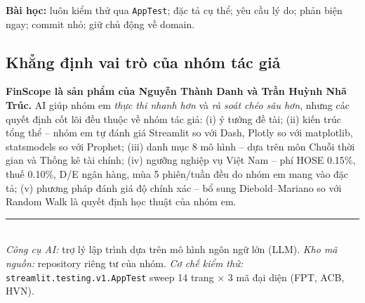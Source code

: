 \documentclass[12pt,a4paper]{article}
\begin{document}
\textbf{Bài học:} luôn kiểm thử qua \texttt{AppTest}; đặc tả cụ thể; yêu cầu lý do; phản biện ngay; commit nhỏ; giữ chủ động về domain.

\subsection{Khẳng định vai trò của nhóm tác giả}

\textbf{FinScope là sản phẩm của Nguyễn Thành Danh và Trần Huỳnh Nhã Trúc.} AI giúp nhóm em \emph{thực thi nhanh hơn} và \emph{rà soát chéo sâu hơn}, nhưng các quyết định cốt lõi đều thuộc về nhóm tác giả: (i) ý tưởng đề tài; (ii) kiến trúc tổng thể -- nhóm em tự đánh giá Streamlit so với Dash, Plotly so với matplotlib, statsmodels so với Prophet; (iii) danh mục 8 mô hình -- dựa trên môn Chuỗi thời gian và Thống kê tài chính; (iv) ngưỡng nghiệp vụ Việt Nam -- phí HOSE 0.15\%, thuế 0.10\%, D/E ngân hàng, mùa 5 phiên/tuần đều do nhóm em mang vào đặc tả; (v) phương pháp đánh giá độ chính xác -- bổ sung Diebold--Mariano so với Random Walk là quyết định học thuật của nhóm em.

\vspace{4pt}
\noindent\rule{\textwidth}{0.3pt}\\[-2pt]
\noindent\footnotesize\textit{Công cụ AI:} trợ lý lập trình dựa trên mô hình ngôn ngữ lớn (LLM).
\textit{Kho mã nguồn:} repository riêng tư của nhóm.
\textit{Cơ chế kiểm thử:} \texttt{streamlit.testing.v1.AppTest} sweep 14 trang $\times$ 3 mã đại diện (FPT, ACB, HVN).
\end{document}
